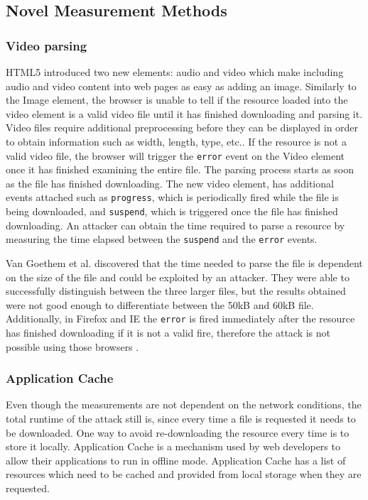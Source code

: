 \documentclass[10pt,a4paper,twoside]{book}
\begin{document}
\subsection{Novel Measurement Methods}
\subsubsection{Video parsing}
HTML5 introduced two new elements: audio and video which make including audio and video content into web pages as easy as adding an image. Similarly to the Image element, the browser is unable to tell if the resource loaded into the video element is a valid video file until it has finished downloading and parsing it. Video files require additional preprocessing before they can be displayed in order to obtain information such as width, length, type, etc.. If the resource is not a valid video file, the browser will trigger the \texttt{error} event on the Video element once it has finished examining the entire file. The parsing process starts as soon as the file has finished downloading. The new video element, has additional events attached such as \texttt{progress}, which is periodically fired while the file is being downloaded, and \texttt{suspend}, which is triggered once the file has finished downloading. An attacker can obtain the time required to parse a resource by measuring the time elapsed between the \texttt{suspend} and the \texttt{error} events.

Van Goethem et al. discovered that the time needed to parse the file is dependent on the size of the file and could be exploited by an attacker. They were able to successfully distinguish between the three larger files, but the results obtained were not good enough to differentiate between the 50kB and 60kB file. Additionally, in Firefox and IE the \texttt{error} is fired immediately after the resource has finished downloading if it is not a valid fire, therefore the attack is not possible using those browsers \cite{van2015clock}.

\subsubsection{Application Cache}
Even though the measurements are not dependent on the network conditions, the total runtime of the attack still is, since every time a file is requested it needs to be downloaded. One way to avoid re-downloading the resource every time is to store it locally. Application Cache is a mechanism used by web developers to allow their applications to run in offline mode. Application Cache has a list of resources which need to be cached and provided from local storage when they are requested. 
\end{document}

